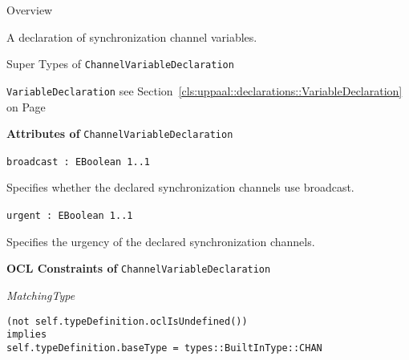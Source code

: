 	\begin{longdescription}
		\item[Overview] 		
				

	

		A declaration of synchronization channel variables.		
		\item[Super Types of \texttt{ChannelVariableDeclaration}] ~
			\begin{longdescription}
				\item[\texttt{VariableDeclaration}] see Section~\ref{cls:uppaal::declarations::VariableDeclaration} on Page~\pageref{cls:uppaal::declarations::VariableDeclaration}						\end{longdescription}
		
	
			\item[\textbf{Attributes of} \texttt{ChannelVariableDeclaration}] ~
			\begin{longdescription}
	\item[\texttt{broadcast : EBoolean 	\symbol{"5B}1..1\symbol{"5D}
}] ~
	
	
	\nopagebreak
		
				

	

		Specifies whether the declared synchronization channels use broadcast.		
	\item[\texttt{urgent : EBoolean 	\symbol{"5B}1..1\symbol{"5D}
}] ~
	
	
	\nopagebreak
		
				

	

		Specifies the urgency of the declared synchronization channels.		
			\end{longdescription}
			\item[\textbf{OCL Constraints of} \texttt{ChannelVariableDeclaration}] ~
			\begin{longdescription}
	\item[\small\textit{MatchingType}] ~ 
	\nopagebreak
	
		\begin{lstlisting}[breaklines=true]
(not self.typeDefinition.oclIsUndefined())
implies
self.typeDefinition.baseType = types::BuiltInType::CHAN		\end{lstlisting}
			\end{longdescription}
	
	\end{longdescription}
	

